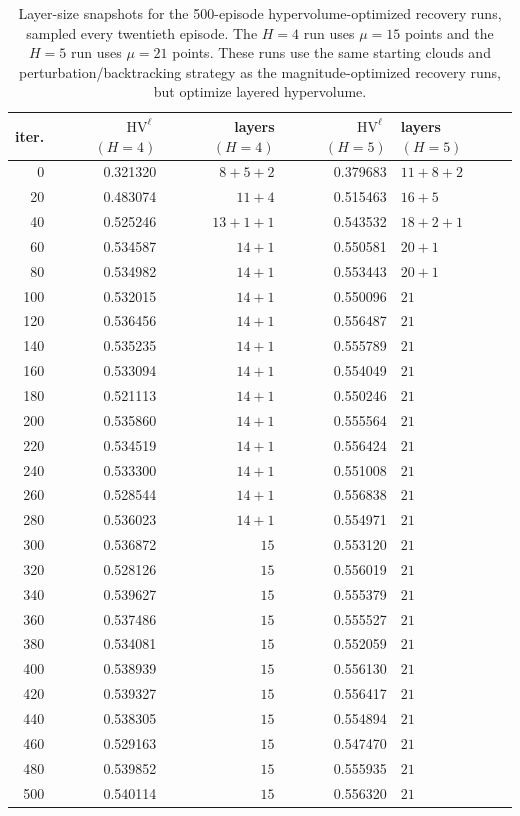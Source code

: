 \documentclass{article}
\newcommand{\HV}{\operatorname{HV}}
\begin{document}
\begin{table}[htbp]
\centering
\small
\setlength{\tabcolsep}{4pt}
\begin{tabular}{rrrrl}
\hline
iter. & $\HV^\ell$ $(H=4)$ & layers $(H=4)$ & $\HV^\ell$ $(H=5)$ & layers $(H=5)$ \\
\hline
0 & 0.321320 & $8+5+2$ & 0.379683 & $11+8+2$ \\
20 & 0.483074 & $11+4$ & 0.515463 & $16+5$ \\
40 & 0.525246 & $13+1+1$ & 0.543532 & $18+2+1$ \\
60 & 0.534587 & $14+1$ & 0.550581 & $20+1$ \\
80 & 0.534982 & $14+1$ & 0.553443 & $20+1$ \\
100 & 0.532015 & $14+1$ & 0.550096 & $21$ \\
120 & 0.536456 & $14+1$ & 0.556487 & $21$ \\
140 & 0.535235 & $14+1$ & 0.555789 & $21$ \\
160 & 0.533094 & $14+1$ & 0.554049 & $21$ \\
180 & 0.521113 & $14+1$ & 0.550246 & $21$ \\
200 & 0.535860 & $14+1$ & 0.555564 & $21$ \\
220 & 0.534519 & $14+1$ & 0.556424 & $21$ \\
240 & 0.533300 & $14+1$ & 0.551008 & $21$ \\
260 & 0.528544 & $14+1$ & 0.556838 & $21$ \\
280 & 0.536023 & $14+1$ & 0.554971 & $21$ \\
300 & 0.536872 & $15$ & 0.553120 & $21$ \\
320 & 0.528126 & $15$ & 0.556019 & $21$ \\
340 & 0.539627 & $15$ & 0.555379 & $21$ \\
360 & 0.537486 & $15$ & 0.555527 & $21$ \\
380 & 0.534081 & $15$ & 0.552059 & $21$ \\
400 & 0.538939 & $15$ & 0.556130 & $21$ \\
420 & 0.539327 & $15$ & 0.556417 & $21$ \\
440 & 0.538305 & $15$ & 0.554894 & $21$ \\
460 & 0.529163 & $15$ & 0.547470 & $21$ \\
480 & 0.539852 & $15$ & 0.555935 & $21$ \\
500 & 0.540114 & $15$ & 0.556320 & $21$ \\
\hline
\end{tabular}
\caption{Layer-size snapshots for the 500-episode hypervolume-optimized recovery runs, sampled every twentieth episode.  The $H=4$ run uses $\mu=15$ points and the $H=5$ run uses $\mu=21$ points.  These runs use the same starting clouds and perturbation/backtracking strategy as the magnitude-optimized recovery runs, but optimize layered hypervolume.}
\label{tab:convergence-hv-recovery-layer-snapshots}
\end{table}
\end{document}

